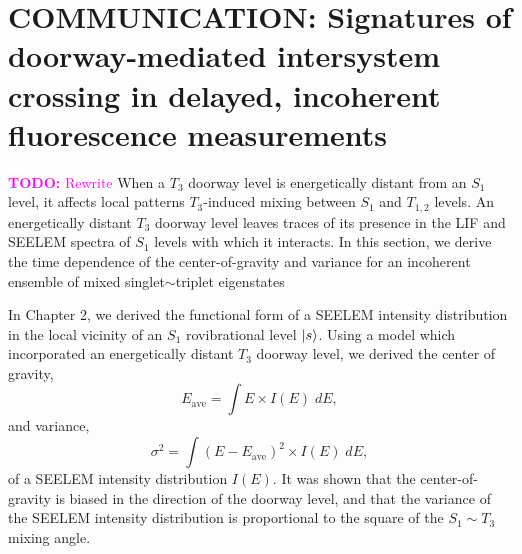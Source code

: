 \documentclass[12pt]{mitthesis}
\newcommand{\TODO} [1]{\textcolor{magenta}{\textbf{TODO:} #1}}
\begin{document}

\section{COMMUNICATION: Signatures of doorway-mediated intersystem
  crossing in delayed, incoherent fluorescence measurements}

\TODO{Rewrite} When a $T_3$ doorway level is energetically distant
from an $S_1$ level, it affects local patterns $T_3$-induced mixing
between $S_1$ and $T_{1,2}$ levels.  An energetically distant $T_3$
doorway level leaves traces of its presence in the LIF and SEELEM
spectra of $S_1$ levels with which it interacts.  In this section, we
derive the time dependence of the center-of-gravity and variance for
an incoherent ensemble of mixed singlet$\sim$triplet eigenstates

In Chapter 2, we derived the functional form of a SEELEM intensity
distribution in the local vicinity of an $S_1$ rovibrational level
$\mathinner{|{s}\rangle}$.  Using a model which incorporated an energetically distant
$T_3$ doorway level, we derived the center of gravity,
\begin{equation}
  E_{\text{ave}} = \int E \times I(E) \; dE,
\end{equation}
and variance,
\begin{equation}
  \sigma^2 = \int (E - E_{\text{ave}})^2 \times I(E) \; dE,
\end{equation}
of a SEELEM intensity distribution $I(E)$.  It was shown that the
center-of-gravity is biased in the direction of the doorway level, and
that the variance of the SEELEM intensity distribution is proportional
to the square of the $S_1 \sim T_3$ mixing angle.
\end{document}
